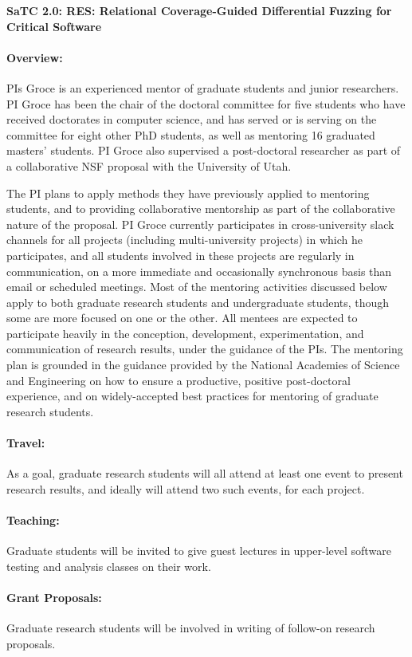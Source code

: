 \documentclass[12pt]{article}
\begin{document}




\begin{center}
{\Large\sf\textbf{SaTC 2.0: RES: Relational Coverage-Guided Differential Fuzzing for Critical Software}}
\end{center}

\paragraph{Overview:} PIs Groce is an experienced mentor of graduate students and junior researchers.  PI Groce has been the chair of the doctoral committee for five students who have received doctorates in computer science, and has served or is serving on the committee for eight other PhD students, as well as mentoring 16 graduated masters' students.  PI Groce also supervised a post-doctoral researcher as part of a collaborative NSF proposal with the University of Utah.  

The PI plans to apply methods they have previously applied to mentoring students, and to providing collaborative mentorship as part of the collaborative nature of the proposal.  PI Groce currently participates in cross-university slack channels for all projects (including multi-university projects) in which he participates, and all students involved in these projects are regularly in communication, on a more immediate and occasionally synchronous basis than email or scheduled meetings.  Most of the mentoring activities discussed below apply to both graduate research students and undergraduate students, though some are more focused on one or the other.  All mentees are expected to participate heavily in the conception, development, experimentation, and communication of research results, under the guidance of the PIs. The mentoring plan is grounded in the guidance provided by the National Academies of Science
and Engineering on how to ensure a productive, positive post-doctoral experience, and on widely-accepted best practices for mentoring of graduate research students.

\paragraph{Travel:} As a goal, graduate research students will all attend at least one event to present research results, and ideally will attend two such events, for each project.

\paragraph{Teaching:}  Graduate students will be invited to give guest lectures in upper-level software testing and analysis classes on their work.

\paragraph{Grant Proposals:}  Graduate research students will be involved in writing of follow-on research proposals.
\end{document}
